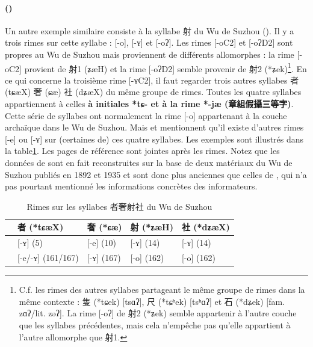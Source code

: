 \documentclass{scrbook}
\newcounter{c}[subsubsection]
\newcommand{\stpc}[1]{\stepcounter{#1}}
\newcommand{\illustre}{Les exemples sont illustrés dans la table\xspace}
\newcommand{\termyyx}[1]{\textbf{#1}}
\begin{document}
\begin{sloppypar}
\stpc{c}\paragraph{()}
Un autre exemple similaire consiste à la syllabe 射 du Wu de Suzhou (\cite[26]{Ye1988suzhou}). Il y a trois rimes sur cette syllabe : [-o], [-ʏ] et [-oʔ]. Les rimes [-oC2] et [-oʔD2] sont propres au Wu de Suzhou mais proviennent de différents allomorphes : la rime [-oC2] provient de 射1 (ʑæH) et la rime [-oʔD2] semble provenir de 射2 (*ʑek)\footnote{C.f. les rimes des autres syllabes partageant le même groupe de rimes dans la même contexte : 隻 (*tɕek) [tsɑʔ], 尺 (*tɕʰek) [tsʰɑʔ] et 石 (*dʑek) [fam. zɑʔ/lit. zəʔ]. La rime [-oʔ] de 射2 (*ʑek) semble appartenir à l'autre couche que les syllabes précédentes, mais cela n'empêche pas qu'elle appartient à l'autre allomorphe que 射1.}. En ce qui concerne la troisième rime [-ʏC2], il faut regarder trois autres syllabes 者 (tɕæX) 奢 (ɕæ) 社 (dʑæX) du même groupe de rimes. Toutes les quatre syllabes appartiennent à celles \termyyx{à initiales *tɕ- et à la rime *-jæ (章組假攝三等字)}. Cette série de syllabes ont normalement la rime [-o] appartenant à la couche archaïque dans le Wu de Suzhou. Mais \textcite[161, 162, 167]{Ye1988suzhou_fangyanzhi} et \textcite[5, 10, 14]{Shi2019she_suzhou} mentionnent qu'il existe d'autres rimes [-e] ou [-ʏ] sur (certaines de) ces quatre syllabes. \illustre \ref{tab:exemple_jia3_suzhou}. Les pages de référence sont jointes après les rimes. Notez que les données de \textcite[5, 10, 14]{Shi2019she_suzhou} sont en fait reconstruites sur la base de deux matériaux du Wu de Suzhou publiés en 1892 et 1935 et sont donc plus anciennes que celles de \textcite[161, 162, 167]{Ye1988suzhou_fangyanzhi}, qui n'a pas pourtant mentionné les informations concrètes des informateurs.

\begin{table}[htbp]
  \centering
    \begin{tabular}{lllll}
    \toprule
          & 者 (*tɕæX) & 奢 (*ɕæ) & 射 (*ʑæH) & 社 (*dʑæX) \\
    \midrule
    \textcite{Shi2019she_suzhou}     & [-ʏ] (5) & [-e] (10) & [-ʏ] (14) & [-ʏ] (14) \\
    \textcite{Ye1988suzhou_fangyanzhi}     & [-e/-ʏ] (161/167) & [-ʏ] (167) & [-o] (162) & [-o] (162) \\
    \bottomrule
    \end{tabular}%
  \caption{Rimes sur les syllabes 者奢射社 du Wu de Suzhou}
  \label{tab:exemple_jia3_suzhou}%
\end{table}%


\end{sloppypar}
\end{document}
